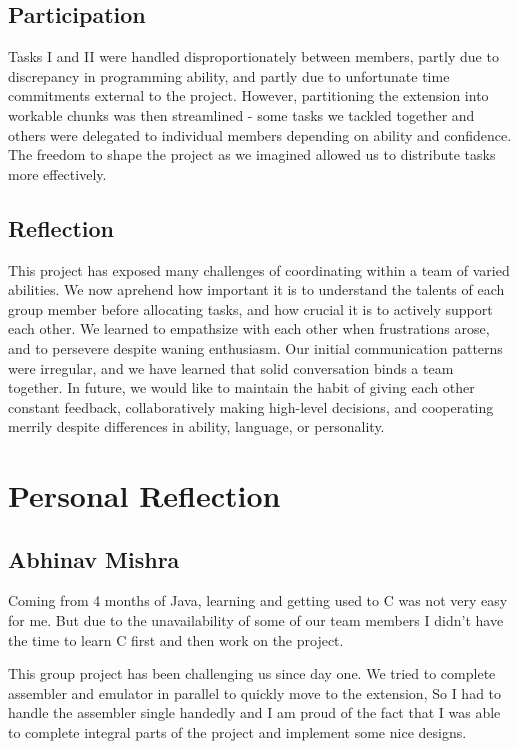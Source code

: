 \documentclass[11pt]{article}
\begin{document}
\subsection{Participation}

Tasks I and II were handled disproportionately between members, partly due to
discrepancy in programming ability, and partly due to unfortunate time
commitments external to the project. However, partitioning the extension into
workable chunks was then streamlined - some tasks we tackled together and
others were delegated to individual members depending on ability and
confidence. The freedom to shape the project as we imagined allowed us to
distribute tasks more effectively.

\subsection{Reflection}

This project has exposed many challenges of coordinating within a team of
varied abilities. We now aprehend how important it is to understand the talents
of each group member before allocating tasks, and how crucial it is to actively
support each other. We learned to empathsize with each other when frustrations
arose, and to persevere despite waning enthusiasm. Our initial communication
patterns were irregular, and we have learned that solid conversation binds
a team together. In future, we would like to maintain the habit of giving each
other constant feedback, collaboratively making high-level decisions, and
cooperating merrily despite differences in ability, language, or personality.

\section{Personal Reflection}

\subsection{Abhinav Mishra}

Coming from 4 months of Java, learning and getting used to C was not very easy
for me. But due to the unavailability of some of our team members I didn't have
the time to learn C first and then work on the project.

This group project has been challenging us since day one. We tried to complete
assembler and emulator in parallel to quickly move to the extension, So I had
to handle the assembler single handedly and I am proud of the fact that I was
able to complete integral parts of the project and implement some nice designs.
\end{document}
